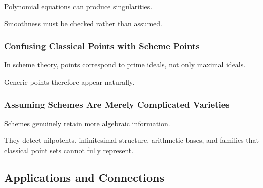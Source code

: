 Polynomial equations can produce singularities.

Smoothness must be checked rather than assumed.

\subsubsection{Confusing Classical Points with Scheme Points}

In scheme theory, points correspond to prime ideals, not only maximal ideals.

Generic points therefore appear naturally.

\subsubsection{Assuming Schemes Are Merely Complicated Varieties}

Schemes genuinely retain more algebraic information.

They detect nilpotents, infinitesimal structure, arithmetic bases, and
families that classical point sets cannot fully represent.

\subsection{Applications and Connections}
\label{subsec:algebraic-geometry-applications}

